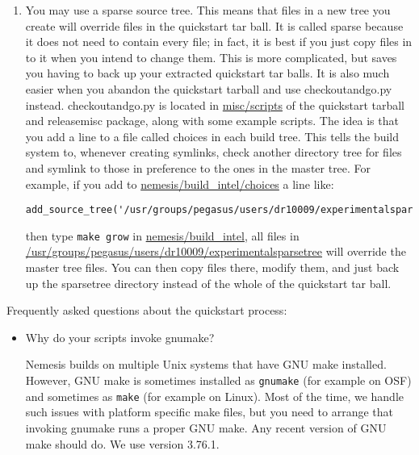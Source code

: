 \documentclass[a4paper]{article}
\newcommand{\cmd}[1]{\texttt{#1}}
\newcommand{\file}[1]{\url{#1}}
\newcommand{\dir}[1]{\url{#1}}
\begin{document}
\begin{enumerate}
\begin{enumerate}
\item You may use a sparse source tree. This means that files in a new
tree you create will override files in the quickstart tar ball. It is
called sparse because it does not need to contain every file; in fact,
it is best if you just copy files in to it when you intend to change
them. This is more complicated, but saves you having to back up your
extracted quickstart tar balls. It is also much easier when you
abandon the quickstart tarball and use checkoutandgo.py
instead. checkoutandgo.py is located in \dir{misc/scripts} of the
quickstart tarball and releasemisc package, along with some example
scripts. The idea is that you add a line to a file called choices in
each build tree. This tells the build system to, whenever creating
symlinks, check another directory tree for files and symlink to those
in preference to the ones in the master tree. For example, if you add
to \file{nemesis/build_intel/choices} a line like:

{\small
\begin{verbatim}
add_source_tree('/usr/groups/pegasus/users/dr10009/experimentalsparsetree')
\end{verbatim}}

then type \cmd{make grow} in \dir{nemesis/build_intel}, all files in
\dir{/usr/groups/pegasus/users/dr10009/experimentalsparsetree} will
override the master tree files. You can then copy files there, modify
them, and just back up the sparsetree directory instead of the whole
of the quickstart tar ball.

\end{enumerate}

\end{enumerate}

Frequently asked questions about the quickstart process:

\begin{itemize}
\item Why do your scripts invoke gnumake?

Nemesis builds on multiple Unix systems that have GNU make
installed. However, GNU make is sometimes installed as
\texttt{gnumake} (for example on OSF) and sometimes as \texttt{make}
(for example on Linux). Most of the time, we handle such issues with
platform specific make files, but you need to arrange that invoking
gnumake runs a proper GNU make. Any recent version of GNU make should
do. We use version 3.76.1.

\end{itemize}
\end{document}

